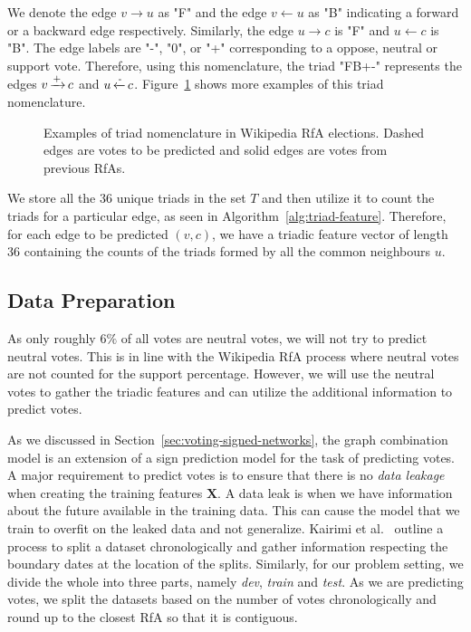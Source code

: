 We denote the edge $v \rightarrow u$ as "F" and the edge $v \leftarrow u$ as "B" indicating a forward or a backward edge respectively.
Similarly, the edge $u \rightarrow c$ is "F" and $u \leftarrow c$ is "B".
The edge labels are "-", "0", or "+" corresponding to a oppose, neutral or support vote.
Therefore, using this nomenclature, the triad "FB+-" represents the edges $v\operatorname*{\xrightarrow{+}} c$ and $u \operatorname*{\xleftarrow{-}} c$.
Figure~\ref{fig:triad-naming} shows more examples of this triad nomenclature.

\begin{figure}[htp]
    \centering
    
    \caption{Examples of triad nomenclature in Wikipedia RfA elections. Dashed edges are votes to be predicted and solid edges are votes from previous RfAs.  }
    \label{fig:triad-naming}
\end{figure}
We store all the 36 unique triads in the set $T$ and then utilize it to count the triads for a particular edge, as seen in Algorithm~\ref{alg:triad-feature}.
Therefore, for each edge to be predicted $(v,c)$, we have a triadic feature vector of length 36 containing the counts of the triads formed by all the common neighbours $u$.  

\subsection{Data Preparation}
\label{subsec:data-prep}
As only roughly $6\%$ of all votes are neutral votes, we will not try to predict neutral votes.
This is in line with the Wikipedia RfA process where neutral votes are not counted for the support percentage. 
However, we will use the neutral votes to gather the triadic features and can utilize the additional information to predict votes.

As we discussed in Section~\ref{sec:voting-signed-networks}, the graph combination model is an extension of a sign prediction model for the task of predicting votes.
A major requirement to predict votes is to ensure that there is no \textit{data leakage} when creating the training features $\mathbf{X}$.
A data leak is when we have information about the future available in the training data.
This can cause the model that we train to overfit on the leaked data and not generalize.
Kairimi et al.\ \cite{karimi2019multicongress} outline a process to split a dataset chronologically and gather information respecting the boundary dates at the location of the splits.
Similarly, for our problem setting, we divide the whole \wikirfa into three parts, namely \textit{dev}, \textit{train} and \textit{test}.
As we are predicting votes, we split the datasets based on the number of votes chronologically and round up to the closest RfA so that it is contiguous. 

